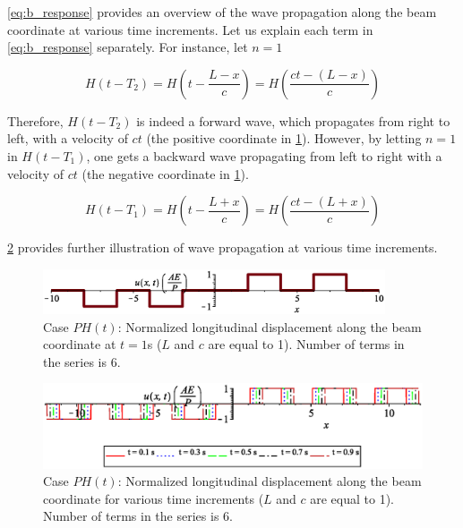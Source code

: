 \documentclass{article}
\begin{document}
\cref{eq:b_response} provides an overview of the wave propagation along the beam coordinate at various time increments. Let us explain each term in \cref{eq:b_response} separately. For instance, let $n = 1$

\begin{equation*}
    H(t-T_2) = H(t - \frac{L - x}{c}) = H(\frac{ct - (L - x)}{c})
\end{equation*}

Therefore, $H(t-T_2)$ is indeed a forward wave, which propagates from right to left, with a velocity of $ct$ (the positive coordinate in \cref{fig:b_u}). However, by letting $n = 1$ in $H(t-T_1)$, one gets a backward wave propagating from left to right with a velocity of $ct$ (the negative coordinate in \cref{fig:b_u}).

\begin{equation*}
    H(t-T_1) = H(t - \frac{L + x}{c}) = H(\frac{ct - (L + x)}{c})
\end{equation*}

\cref{fig:b_u_diff_time_inc} provides further illustration of wave propagation at various time increments. 

\begin{figure}[H]
    \centering
    \includegraphics[width = 0.9\textwidth ]{figures/b_u.eps}
    \caption{Case $P H(t)$: Normalized longitudinal displacement along the beam coordinate at $t = 1$s ($L$ and $c$ are equal to 1). Number of terms in the series is 6.}
    \label{fig:b_u}
\end{figure}

\begin{figure}[H]
    \centering
    \includegraphics[width = 0.9
    \textwidth ]{figures/b_u_diff_time_inc.eps}
    \caption{Case $P H(t)$: Normalized longitudinal displacement along the beam coordinate for various time increments ($L$ and $c$ are equal to 1). Number of terms in the series is 6.}
    \label{fig:b_u_diff_time_inc}
\end{figure}
\end{document}
